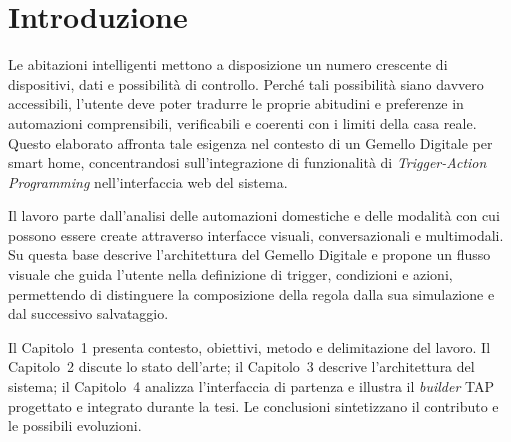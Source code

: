  \setlength{\headheight}{14.49998pt}
 
\chapter{Introduzione}
Le abitazioni intelligenti mettono a disposizione un numero crescente di dispositivi, dati e possibilit\`a di controllo. Perch\'e tali possibilit\`a siano davvero accessibili, l'utente deve poter tradurre le proprie abitudini e preferenze in automazioni comprensibili, verificabili e coerenti con i limiti della casa reale. Questo elaborato affronta tale esigenza nel contesto di un Gemello Digitale per smart home, concentrandosi sull'integrazione di funzionalit\`a di \textit{Trigger-Action Programming} nell'interfaccia web del sistema.

Il lavoro parte dall'analisi delle automazioni domestiche e delle modalit\`a con cui possono essere create attraverso interfacce visuali, conversazionali e multimodali. Su questa base descrive l'architettura del Gemello Digitale e propone un flusso visuale che guida l'utente nella definizione di trigger, condizioni e azioni, permettendo di distinguere la composizione della regola dalla sua simulazione e dal successivo salvataggio.

Il Capitolo~1 presenta contesto, obiettivi, metodo e delimitazione del lavoro. Il Capitolo~2 discute lo stato dell'arte; il Capitolo~3 descrive l'architettura del sistema; il Capitolo~4 analizza l'interfaccia di partenza e illustra il \textit{builder} TAP progettato e integrato durante la tesi. Le conclusioni sintetizzano il contributo e le possibili evoluzioni.
